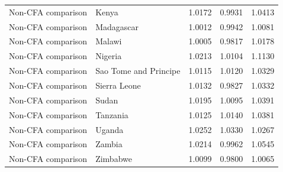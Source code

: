 \begin{table}
\begin{tabular}[t]{llrrr}
Non-CFA comparison & Kenya & 1.0172 & 0.9931 & 1.0413\\
\addlinespace
Non-CFA comparison & Madagascar & 1.0012 & 0.9942 & 1.0081\\
Non-CFA comparison & Malawi & 1.0005 & 0.9817 & 1.0178\\
Non-CFA comparison & Nigeria & 1.0213 & 1.0104 & 1.1130\\
Non-CFA comparison & Sao Tome and Principe & 1.0115 & 1.0120 & 1.0329\\
Non-CFA comparison & Sierra Leone & 1.0132 & 0.9827 & 1.0332\\
\addlinespace
Non-CFA comparison & Sudan & 1.0195 & 1.0095 & 1.0391\\
Non-CFA comparison & Tanzania & 1.0125 & 1.0140 & 1.0381\\
Non-CFA comparison & Uganda & 1.0252 & 1.0330 & 1.0267\\
Non-CFA comparison & Zambia & 1.0214 & 0.9962 & 1.0545\\
Non-CFA comparison & Zimbabwe & 1.0099 & 0.9800 & 1.0065\\
\bottomrule
\end{tabular}
\end{table}